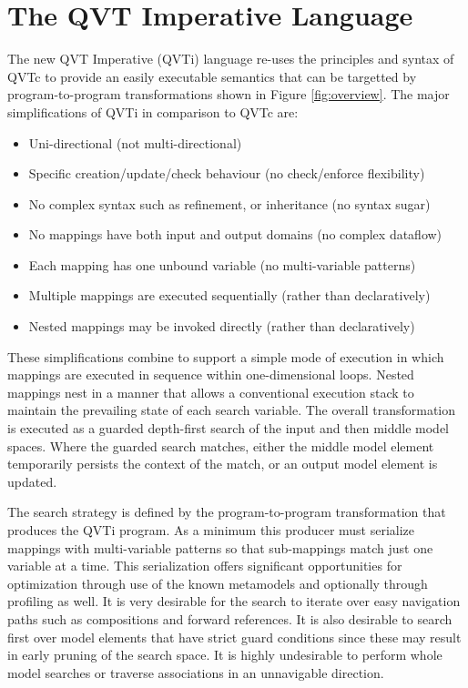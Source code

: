 %
\section{The QVT Imperative Language}\label{sec:qvti}
The new QVT Imperative (QVTi) language re-uses the principles and syntax of QVTc to provide an easily executable semantics that can be targetted by program-to-program transformations shown in Figure \ref{fig:overview}. The major simplifications of QVTi in comparison to QVTc are:
\begin{itemize}
\item Uni-directional (not multi-directional)
\item Specific creation/update/check behaviour (no check/enforce flexibility)
\item No complex syntax such as refinement, or inheritance (no syntax sugar)
\item No mappings have both input and output domains (no complex dataflow)
\item Each mapping has one unbound variable (no multi-variable patterns) 
\item Multiple mappings are executed sequentially (rather than declaratively)
\item Nested mappings may be invoked directly (rather than declaratively)
\end{itemize}

These simplifications combine to support a simple mode of execution in which mappings are executed in sequence within one-dimensional loops. Nested mappings nest in a manner that allows a conventional execution stack to maintain the prevailing state of each search variable. The overall transformation is executed as a guarded depth-first search of the input and then middle model spaces. Where the guarded search matches, either the middle model element temporarily persists the context of the match, or an output model element is updated.

The search strategy is defined by the program-to-program transformation that produces the QVTi program. As a minimum this producer must serialize mappings with multi-variable patterns so that sub-mappings match just one variable at a time. This serialization offers significant opportunities for optimization through use of the known metamodels and optionally through profiling as well. It is very desirable for the search to iterate over easy navigation paths such as compositions and forward references. It is also desirable to search first over model elements that have strict guard conditions since these may result in early pruning of the search space. It is highly undesirable to perform whole model searches or traverse associations in an unnavigable direction. 

